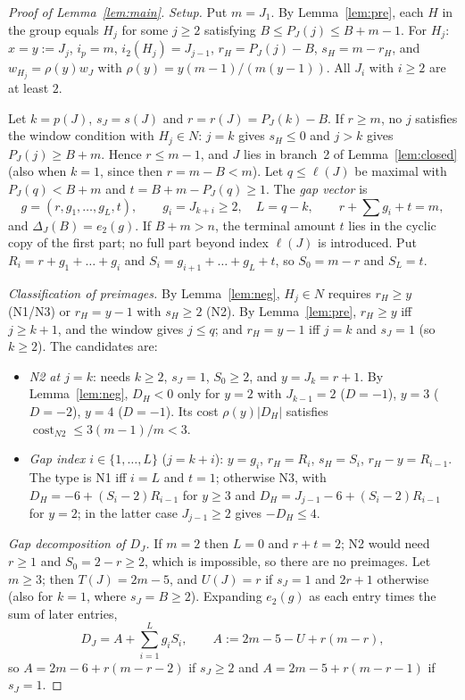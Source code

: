 \documentclass[11pt]{article}
\theoremstyle{remark}
\theoremstyle{definition}
\DeclareMathOperator{\cost}{cost}
\begin{document}
\begin{proof}[Proof of Lemma~\ref{lem:main}]
\emph{Setup.} Put $m=J_1$. By Lemma~\ref{lem:pre}, each $H$ in the group equals $H_j$ for some $j\ge2$ satisfying $B\le P_J(j)\le B+m-1$. For $H_j$: $x=y:=J_j$, $i_p=m$, $i_2(H_j)=J_{j-1}$, $r_H=P_J(j)-B$, $s_H=m-r_H$, and $w_{H_j}=\rho(y)w_J$ with $\rho(y)=y(m-1)/(m(y-1))$. All $J_i$ with $i\ge2$ are at least $2$.

Let $k=p(J)$, $s_J=s(J)$ and $r=r(J)=P_J(k)-B$. If $r\ge m$, no $j$ satisfies the window condition with $H_j\in N$: $j=k$ gives $s_H\le0$ and $j>k$ gives $P_J(j)\ge B+m$. Hence $r\le m-1$, and $J$ lies in branch~2 of Lemma~\ref{lem:closed} (also when $k=1$, since then $r=m-B<m$). Let $q\le\ell(J)$ be maximal with $P_J(q)<B+m$ and $t=B+m-P_J(q)\ge1$. The \emph{gap vector} is
\[
g=(r,g_1,\dots,g_L,t),\qquad g_i=J_{k+i}\ge2,\quad L=q-k,\qquad r+\textstyle\sum g_i+t=m,
\]
and $\Delta_J(B)=e_2(g)$. If $B+m>n$, the terminal amount $t$ lies in the cyclic copy of the first part; no full part beyond index $\ell(J)$ is introduced. Put $R_i=r+g_1+\dots+g_i$ and $S_i=g_{i+1}+\dots+g_L+t$, so $S_0=m-r$ and $S_L=t$.

\emph{Classification of preimages.} By Lemma~\ref{lem:neg}, $H_j\in N$ requires $r_H\ge y$ (N1/N3) or $r_H=y-1$ with $s_H\ge2$ (N2). By Lemma~\ref{lem:pre}, $r_H\ge y$ iff $j\ge k+1$, and the window gives $j\le q$; and $r_H=y-1$ iff $j=k$ and $s_J=1$ (so $k\ge2$). The candidates are:
\begin{itemize}
\item \emph{N2 at $j=k$}: needs $k\ge2$, $s_J=1$, $S_0\ge2$, and $y=J_k=r+1$. By Lemma~\ref{lem:neg}, $D_H<0$ only for $y=2$ with $J_{k-1}=2$ ($D=-1$), $y=3$ ($D=-2$), $y=4$ ($D=-1$). Its cost $\rho(y)|D_H|$ satisfies $\cost_{N2}\le 3(m-1)/m<3$.
\item \emph{Gap index $i\in\{1,\dots,L\}$} ($j=k+i$): $y=g_i$, $r_H=R_i$, $s_H=S_i$, $r_H-y=R_{i-1}$. The type is N1 iff $i=L$ and $t=1$; otherwise N3, with $D_H=-6+(S_i-2)R_{i-1}$ for $y\ge3$ and $D_H=J_{j-1}-6+(S_i-2)R_{i-1}$ for $y=2$; in the latter case $J_{j-1}\ge2$ gives $-D_H\le4$.
\end{itemize}

\emph{Gap decomposition of $D_J$.} If $m=2$ then $L=0$ and $r+t=2$; N2 would need $r\ge1$ and $S_0=2-r\ge2$, which is impossible, so there are no preimages. Let $m\ge3$; then $T(J)=2m-5$, and $U(J)=r$ if $s_J=1$ and $2r+1$ otherwise (also for $k=1$, where $s_J=B\ge2$). Expanding $e_2(g)$ as each entry times the sum of later entries,
\[
D_J=A+\sum_{i=1}^{L}g_iS_i,\qquad A:=2m-5-U+r(m-r),
\]
so $A=2m-6+r(m-r-2)$ if $s_J\ge2$ and $A=2m-5+r(m-r-1)$ if $s_J=1$.


\end{proof}
\end{document}
